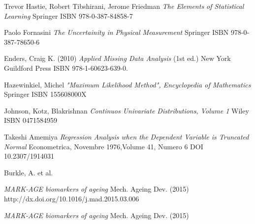 \documentclass[12pt,openright,twoside,a4paper]{book}
\begin{document}
\begin{thebibliography}{99}
Trevor Hastie, Robert Tibshirani, Jerome Friedman
\emph{The Elements of Statistical Learning}
Springer ISBN 978-0-387-84858-7

Paolo Fornasini
\emph{The Uncertainity in Physical Measurement}
Springer ISBN 978-0-387-78650-6

Enders, Craig K. (2010)
\emph{Applied Missing Data Analysis } (1st ed.)
 New York
 Guildford Press ISBN 978-1-60623-639-0.

Hazewinkiel, Michel
\emph{"Maximum Likelihood Method", Encyclopedia of Mathematics}
Springer ISBN 155608000X

Johnson, Kotz, Blakrishnan
\emph{Continuos Univariate Distributions, Volume 1}
Wiley ISBN 0471584959 

Takeshi Amemiya
\emph{Regression Analysis when the Dependent Variable is Truncated Normal}
Econometrica, Novembre 1976,Volume 41, Numero 6  DOI 10.2307/1914031

Burkle, A. et al.

\emph{MARK-AGE biomarkers of ageing} 
Mech. Ageing Dev. (2015) http://dx.doi.org/10.1016/j.mad.2015.03.006

\emph{MARK-AGE biomarkers of ageing}
Mech. Ageing Dev. (2015)

\end{thebibliography}
\end{document}
